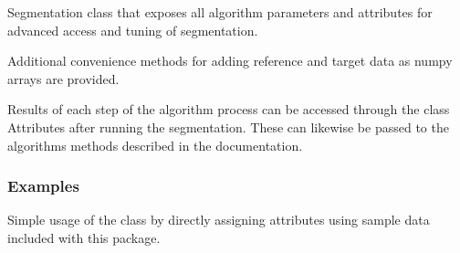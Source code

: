 \documentclass[letterpaper,10pt,english]{sphinxmanual}
\begin{document}
\begin{fulllineitems}
\label{\detokenize{generated/seg1d.Segmenter:seg1d.Segmenter}}
\sphinxAtStartPar
Segmentation class that exposes all algorithm parameters and attributes for
advanced access and tuning of segmentation.

\sphinxAtStartPar
Additional convenience methods for adding reference and target data as
numpy arrays are provided.

\sphinxAtStartPar
Results of each step of the algorithm process can be accessed through the
class Attributes after running the segmentation. These can likewise be
passed to the algorithms methods described in the documentation.
\subsubsection*{Examples}

\sphinxAtStartPar
Simple usage of the class by directly assigning attributes
using sample data included with this package.

\begin{sphinxVerbatim}[commandchars=\\\{\}]
 
   
  
  
    
 
\PYG{g+go}{array([[207.       , 240.       ,   0.9124224],}
\PYG{g+go}{       [ 72.       , 112.       ,   0.8776795]])}
\end{sphinxVerbatim}


\end{fulllineitems}
\end{document}
